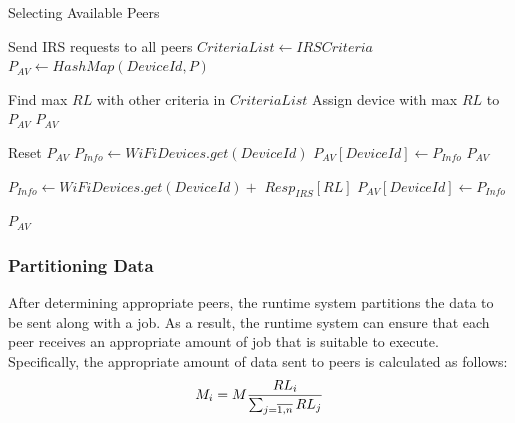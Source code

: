\documentclass{sig-alternate}
\begin{document}
\begin{algorithm}
\caption{Selecting Available Peers}
\label{alg:select_peers}
\begin{algorithmic}[1] 
\begin{scriptsize}
\State Send IRS requests to all peers 
\State $CriteriaList \leftarrow IRSCriteria$
\State $P_{AV} \leftarrow HashMap(DeviceId, P)$

  	\State Find max $RL$ with other criteria in $CriteriaList$
		\State Assign device with max $RL$ to $P_{AV}$
  	\State \Return $P_{AV}$
  \EndFor
\EndIf

  	\State Reset $P_{AV}$ 
  	\State $P_{Info} \leftarrow WiFiDevices.get(DeviceId)$
  	\State $P_{AV}[DeviceId] \leftarrow P_{Info}$
  	\State \Return $P_{AV}$
  \EndIf

  	\State $P_{Info} \leftarrow WiFiDevices.get(DeviceId) + $
		\State
			\hspace{\algorithmicindent}
			\hspace{\algorithmicindent}
			\hspace{\algorithmicindent}
			\hspace{\algorithmicindent}
			$Resp_{IRS}[RL]$
  	\State $P_{AV}[DeviceId] \leftarrow P_{Info}$
  \EndIf
\EndFor

\State \Return $P_{AV}$
\EndFunction
\end{scriptsize}
\end{algorithmic}

\end{algorithm}

\subsubsection{Partitioning Data}\label{ss_jqfp}
After determining appropriate peers, the runtime system partitions the data to be sent along with a job. As a result, the runtime system can ensure that each peer receives an appropriate amount of job that is suitable to execute. Specifically, the appropriate amount of data sent to peers is calculated as follows:
\begin{equation} 
\label{eq:data_amount} \small
M_{i} = M\frac{RL_{i}}{\sum_{j = \overline{1,n}}{RL_{j}}}
\end{equation}
\end{document}
